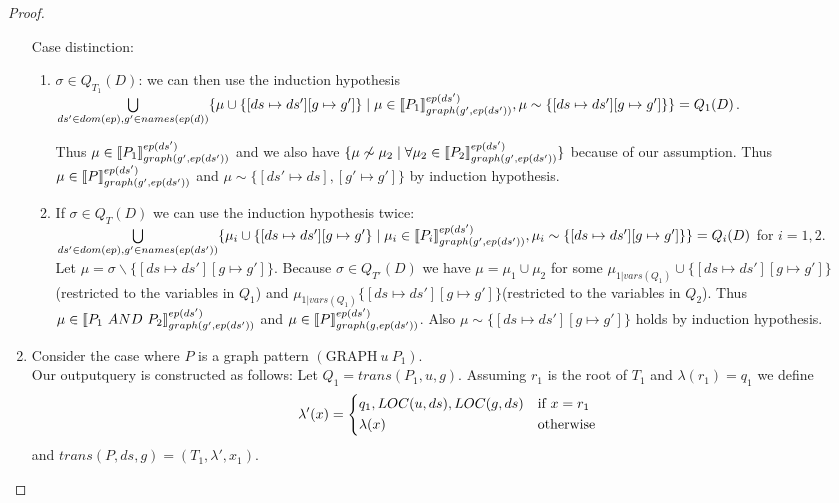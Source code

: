 \begin{proof}
\begin{enumerate}
	Case distinction:
	\begin{enumerate}
		\item $\sigma \in Q_{T_1}(D)$: 
			we can then use the induction hypothesis  
			$\bigcup\limits_{ds' \in dom(ep), g' \in names(ep(d))} \{ \mu \cup \{[ds
				\mapsto ds'] [g	\mapsto g']\} \mid \mu
				\in \llbracket P_1 \rrbracket^{ep(ds')}_{graph(g',ep(ds'))}, \mu \sim \{[ds
			\mapsto ds'] [g \mapsto g']\} \}  =	Q_1(D) $. 

			Thus $\mu \in \llbracket P_1 \rrbracket^{ep(ds')}_{graph(g',ep(ds'))}$ 
			and we also have $\{\mu \not\sim \mu_2 \mid \forall \mu_2 \in
			\llbracket P_2 \rrbracket^{ep(ds')}_{graph(g',ep(ds'))} \}$ because of our assumption.
			Thus $\mu \in \llbracket P \rrbracket_{graph(g',ep(ds'))}^{ep(ds')}$ and $\mu \sim
			\{[ds' \mapsto ds],[g'\mapsto g']\}$ by induction hypothesis.

		\item If $\sigma \in Q_{T}(D)$  we can use the induction hypothesis twice:\\
			$\bigcup\limits_{ds' \in dom(ep),g' \in names(ep(ds'))} \{ \mu_i \cup\{[ds
					\mapsto ds'] [g \mapsto g'\}  \mid \mu_i
					\in \llbracket P_i \rrbracket^{ep(ds')}_{graph(g',ep(ds'))}, \mu_i \sim \{[ds
				\mapsto ds'] [g \mapsto g']\}\}  = Q_i(D)$ for $i=1,2$.\\
				Let $\mu = \sigma \backslash \{[ds \mapsto ds'] [g \mapsto g']\}$.
				Because $\sigma \in Q_{T'}(D)$ we have $\mu = \mu_1 \cup \mu_2$ for
				some $\mu_{1|vars(Q_1)}\cup\{[ds \mapsto ds'] [g \mapsto g']\}$(restricted to
			the variables in $Q_1$) and 
			$\mu_{1|vars(Q_1)}\{[ds \mapsto ds'] [g \mapsto g']\}$(restricted to
			the variables in $Q_2$).
				Thus $\mu \in \llbracket P_1 \ AND \ P_2 \rrbracket^{ep(ds')}_{graph(g',ep(ds'))}$
				and $\mu \in \llbracket P \rrbracket^{ep(ds')}_{graph(g,ep(ds'))}$. Also $\mu \sim
				\{[ds \mapsto ds'] [g \mapsto g']\}$ holds by induction
				hypothesis.
		\end{enumerate}

	\item Consider the case where $P$ is a graph pattern $(\mbox{GRAPH} \ u \ P_1)$. \\
		Our outputquery is constructed as follows: Let $Q_1 = trans(P_1,u,g)$. 
		Assuming $r_1$ is the root of $T_1$ and $\lambda(r_1) = q_1$ we define
		\[ \lambda'(x) =\begin{dcases*} 
				q_1, LOC(u,ds),LOC(g,ds)& if $x = r_1$\\
				\lambda(x) & otherwise	\\
			\end{dcases*}
		\] and $trans(P,ds,g) = (T_1,\lambda',x_1)$.
		

\end{enumerate}
\end{proof}
